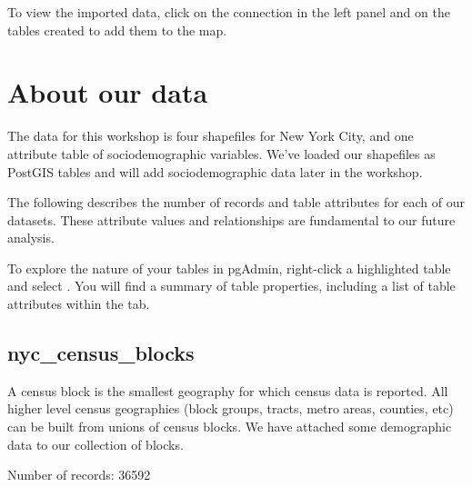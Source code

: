 \documentclass[a4paper,11pt,english]{sphinxmanual}
\begin{document}
To view the imported data, click on the connection in the left panel and  on the tables created to add them to the map.

\noindent{}


\section{About our data}
\label{\detokenize{setup:about-our-data}}\label{\detokenize{setup:about-data}}
The data for this workshop is four shapefiles for New York City, and one attribute table of sociodemographic variables.  We’ve loaded our shapefiles as PostGIS tables and will add sociodemographic data later in the workshop.

The following describes the number of records and table attributes for each of our datasets.  These attribute values and relationships are fundamental to our future analysis.

To explore the nature of your tables in pgAdmin, right-click a highlighted table and select .  You will find a summary of table properties, including a list of table attributes within the  tab.


\subsection{nyc\_census\_blocks}
\label{\detokenize{setup:nyc-census-blocks}}
A census block is the smallest geography for which census data is reported. All higher level census geographies (block groups, tracts, metro areas, counties, etc) can be built from unions of census blocks. We have attached some demographic data to our collection of blocks.

Number of records: 36592
\end{document}

